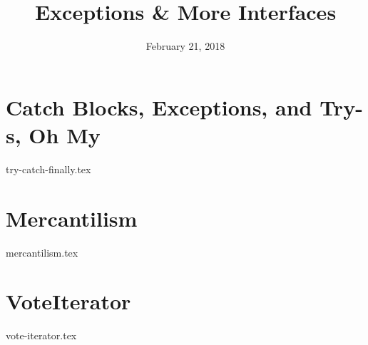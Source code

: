 \documentclass[11pt]{exam}
\title{Exceptions \& More Interfaces}
\date{February 21, 2018}
\begin{document}
\maketitle

\section{Catch Blocks, Exceptions, and Try-s, Oh My}
\begin{questions}
{try-catch-finally.tex}
\end{questions}

\section{Mercantilism}
\begin{questions}
{mercantilism.tex}
\end{questions}

\section{VoteIterator}
\begin{questions}
{vote-iterator.tex}
\end{questions}
\end{document}
